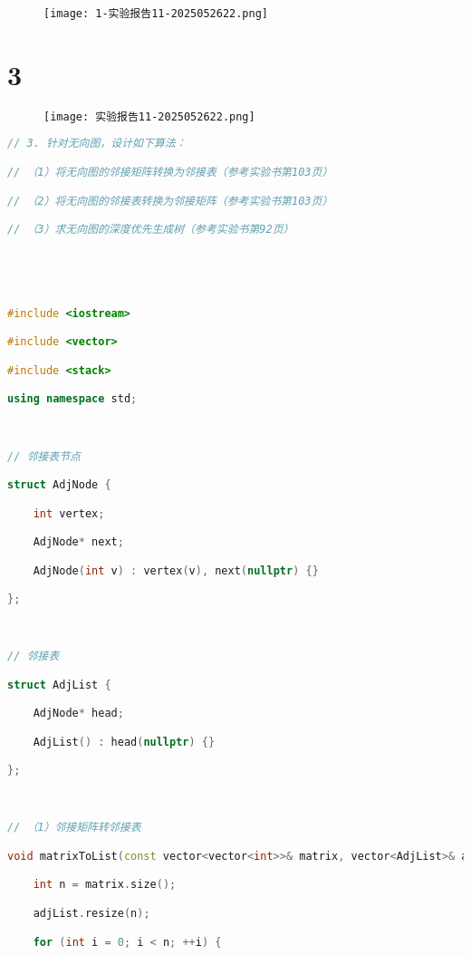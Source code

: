 \begin{figure}[H]
\centering
\texttt{[image: 1-实验报告11-2025052622.png]}
\label{}
\end{figure}

\section{3}

\begin{figure}[H]
\centering
\texttt{[image: 实验报告11-2025052622.png]}
\label{}
\end{figure}

\begin{lstlisting}[language=C++]
// 3. 针对无向图，设计如下算法：

// （1）将无向图的邻接矩阵转换为邻接表（参考实验书第103页）

// （2）将无向图的邻接表转换为邻接矩阵（参考实验书第103页）

// （3）求无向图的深度优先生成树（参考实验书第92页）

  
  
  

#include <iostream>

#include <vector>

#include <stack>

using namespace std;

  

// 邻接表节点

struct AdjNode {

    int vertex;

    AdjNode* next;

    AdjNode(int v) : vertex(v), next(nullptr) {}

};

  

// 邻接表

struct AdjList {

    AdjNode* head;

    AdjList() : head(nullptr) {}

};

  

// （1）邻接矩阵转邻接表

void matrixToList(const vector<vector<int>>& matrix, vector<AdjList>& adjList) {

    int n = matrix.size();

    adjList.resize(n);

    for (int i = 0; i < n; ++i) {


\end{lstlisting}
